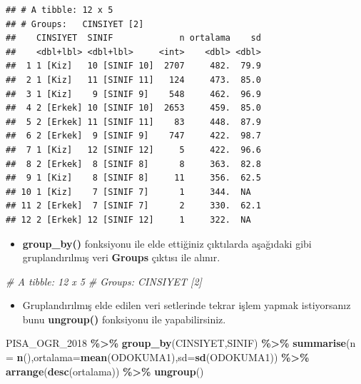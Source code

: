 \documentclass[
  oneside]{book}
\newenvironment{Shaded}{\begin{snugshade}}{\end{snugshade}}
\newcommand{\AttributeTok}[1]{\textcolor[rgb]{0.13,0.29,0.53}{#1}}
\newcommand{\CommentTok}[1]{\textcolor[rgb]{0.56,0.35,0.01}{\textit{#1}}}
\newcommand{\FunctionTok}[1]{\textcolor[rgb]{0.13,0.29,0.53}{\textbf{#1}}}
\newcommand{\NormalTok}[1]{#1}
\newcommand{\SpecialCharTok}[1]{\textcolor[rgb]{0.81,0.36,0.00}{\textbf{#1}}}
\providecommand{\tightlist}{%
  \setlength{\itemsep}{0pt}\setlength{\parskip}{0pt}}
\begin{document}
\begin{verbatim}
## # A tibble: 12 x 5
## # Groups:   CINSIYET [2]
##    CINSIYET  SINIF             n ortalama    sd
##    <dbl+lbl> <dbl+lbl>     <int>    <dbl> <dbl>
##  1 1 [Kiz]   10 [SINIF 10]  2707     482.  79.9
##  2 1 [Kiz]   11 [SINIF 11]   124     473.  85.0
##  3 1 [Kiz]    9 [SINIF 9]    548     462.  96.9
##  4 2 [Erkek] 10 [SINIF 10]  2653     459.  85.0
##  5 2 [Erkek] 11 [SINIF 11]    83     448.  87.9
##  6 2 [Erkek]  9 [SINIF 9]    747     422.  98.7
##  7 1 [Kiz]   12 [SINIF 12]     5     422.  96.6
##  8 2 [Erkek]  8 [SINIF 8]      8     363.  82.8
##  9 1 [Kiz]    8 [SINIF 8]     11     356.  62.5
## 10 1 [Kiz]    7 [SINIF 7]      1     344.  NA  
## 11 2 [Erkek]  7 [SINIF 7]      2     330.  62.1
## 12 2 [Erkek] 12 [SINIF 12]     1     322.  NA
\end{verbatim}

\begin{itemize}
\tightlist
\item
  \textbf{group\_by()} fonksiyonu ile elde ettiğiniz çıktılarda aşağıdaki gibi
  gruplandırılmış veri \textbf{Groups} çıktısı ile alınır.
\end{itemize}

\begin{Shaded}
\begin{Highlighting}[]
\CommentTok{\# A tibble: 12 x 5}
\CommentTok{\# Groups:   CINSIYET [2]}
\end{Highlighting}
\end{Shaded}

\begin{itemize}
\tightlist
\item
  Gruplandırılmış elde edilen veri setlerinde tekrar işlem yapmak istiyorsanız bunu \textbf{ungroup()} fonksiyonu ile yapabilirsiniz.
\end{itemize}

\begin{Shaded}
\begin{Highlighting}[]
\NormalTok{PISA\_OGR\_2018 }\SpecialCharTok{\%\textgreater{}\%}
  \FunctionTok{group\_by}\NormalTok{(CINSIYET,SINIF) }\SpecialCharTok{\%\textgreater{}\%}
  \FunctionTok{summarise}\NormalTok{(}\AttributeTok{n =} \FunctionTok{n}\NormalTok{(),}\AttributeTok{ortalama=}\FunctionTok{mean}\NormalTok{(ODOKUMA1),}\AttributeTok{sd=}\FunctionTok{sd}\NormalTok{(ODOKUMA1)) }\SpecialCharTok{\%\textgreater{}\%}
  \FunctionTok{arrange}\NormalTok{(}\FunctionTok{desc}\NormalTok{(ortalama)) }\SpecialCharTok{\%\textgreater{}\%} 
  \FunctionTok{ungroup}\NormalTok{()}
\end{Highlighting}
\end{Shaded}
\end{document}
